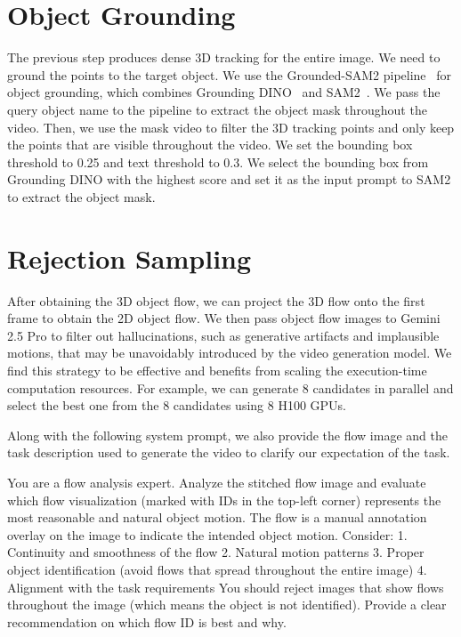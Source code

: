 \begin{appendices}
\section{Object Grounding}
The previous step produces dense 3D tracking for the entire image.
We need to ground the points to the target object.
We use the Grounded-SAM2 pipeline~\cite{ren_grounded_2024} for object grounding, which combines Grounding DINO~\cite{liu_grounding_2025} and SAM2~\cite{ravi_sam_2024}.
We pass the query object name to the pipeline to extract the object mask throughout the video.
Then, we use the mask video to filter the 3D tracking points and only keep the points that are visible throughout the video.
We set the bounding box threshold to 0.25 and text threshold to 0.3.
We select the bounding box from Grounding DINO with the highest score and set it as the input prompt to SAM2 to extract the object mask.

\section{Rejection Sampling}
After obtaining the 3D object flow, we can project the 3D flow onto the first frame to obtain the 2D object flow.
We then pass object flow images to Gemini 2.5 Pro to filter out hallucinations, such as generative artifacts and implausible motions, that may be unavoidably introduced by the video generation model.
We find this strategy to be effective and benefits from scaling the execution-time computation resources.
For example, we can generate 8 candidates in parallel and select the best one from the 8 candidates using 8 H100 GPUs.

Along with the following system prompt, we also provide the flow image and the task description used to generate the video to clarify our expectation of the task.
\begin{tcolorbox}[colback=gray!10,colframe=purple,title=Rejection Sampling System Prompt,width=\columnwidth]
    You are a flow analysis expert. Analyze the stitched flow image and evaluate which flow visualization (marked with IDs in the top-left corner) represents the most reasonable and natural object motion. 
    The flow is a manual annotation overlay on the image to indicate the intended object motion.
    Consider:
    1. Continuity and smoothness of the flow
    2. Natural motion patterns
    3. Proper object identification (avoid flows that spread throughout the entire image)
    4. Alignment with the task requirements
    You should reject images that show flows throughout the image (which means the object is not identified).
    Provide a clear recommendation on which flow ID is best and why.
\end{tcolorbox}


\end{appendices}
